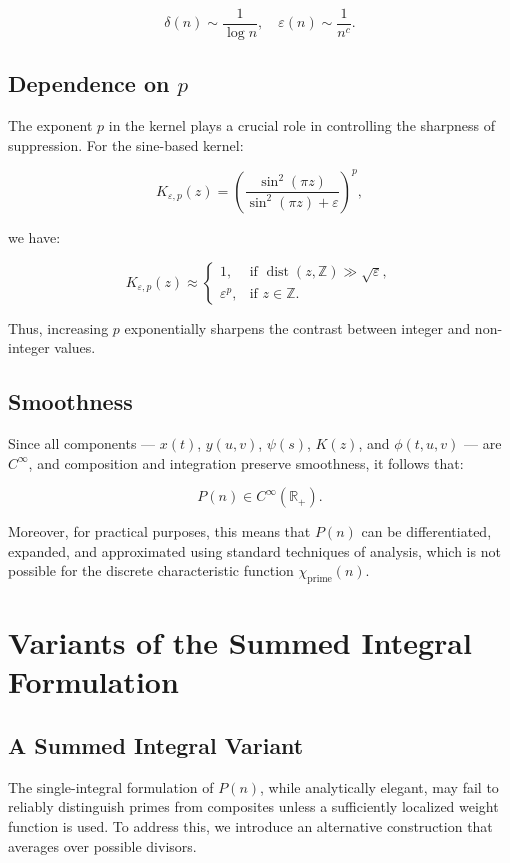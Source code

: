 \documentclass[12pt]{article}
\theoremstyle{definition}
\theoremstyle{plain}
\theoremstyle{remark}
\begin{document}
\[
\delta(n) \sim \frac{1}{\log n}, \quad \varepsilon(n) \sim \frac{1}{n^c}.
\]

\subsection{Dependence on \texorpdfstring{\( p \)}{p}}

The exponent \( p \) in the kernel plays a crucial role in controlling the sharpness of suppression. For the sine-based kernel:

\[
K_{\varepsilon,p}(z) = \left( \frac{\sin^2(\pi z)}{\sin^2(\pi z) + \varepsilon} \right)^p,
\]

we have:

\[
K_{\varepsilon,p}(z) \approx
\begin{cases}
1, & \text{if } \operatorname{dist}(z, \mathbb{Z}) \gg \sqrt{\varepsilon}, \\
\varepsilon^p, & \text{if } z \in \mathbb{Z}.
\end{cases}
\]

Thus, increasing \( p \) exponentially sharpens the contrast between integer and non-integer values.

\subsection{Smoothness}

Since all components — \( x(t) \), \( y(u,v) \), \( \psi(s) \), \( K(z) \), and \( \phi(t,u,v) \) — are \( C^\infty \), and composition and integration preserve smoothness, it follows that:

\[
P(n) \in C^\infty(\mathbb{R}_+).
\]

Moreover, for practical purposes, this means that \( P(n) \) can be differentiated, expanded, and approximated using standard techniques of analysis, which is not possible for the discrete characteristic function \( \chi_{\mathrm{prime}}(n) \).

\section{Variants of the Summed Integral Formulation}

\subsection{A Summed Integral Variant}

The single-integral formulation of \( P(n) \), while analytically elegant, may fail to reliably distinguish primes from composites unless a sufficiently localized weight function is used. To address this, we introduce an alternative construction that averages over possible divisors.
\end{document}
